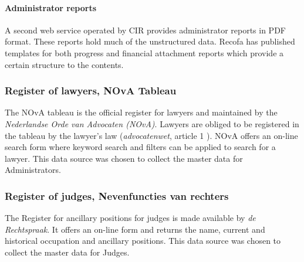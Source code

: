 \paragraph{Administrator reports}
A second web service operated by CIR provides administrator reports in PDF format. These reports hold much of the unstructured data. Recofa has published templates for both progress and financial attachment reports \cite{rechtspraak:recofa} which provide a certain structure to the contents.

\subsubsection{Register of lawyers, NOvA Tableau}\label{NOvA Tableau}
The NOvA tableau is the official register for lawyers and maintained by the \textit{Nederlandse Orde van Advocaten (NOvA)}\cite{nova:1}. Lawyers are obliged to be registered in the tableau by the lawyer's law (\textit{advocatenwet}, article 1 \cite{law:2}). NOvA offers an on-line search form where keyword search and filters can be applied to search for a lawyer. This data source was chosen to collect the master data for Administrators. 

\subsubsection{Register of judges, Nevenfuncties van rechters}\label{Nevenfuncties Rechters}
The Register for ancillary positions for judges is made available by \textit{de Rechtspraak}\cite{rechtspraak:nevenfuncties}. It offers an on-line form and returns the name, current and historical occupation and ancillary positions. This data source was chosen to collect the master data for Judges.
